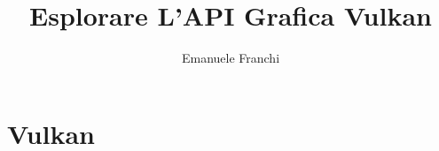 \documentclass{beamer}
\title{Esplorare L'API Grafica Vulkan}
\author{Emanuele Franchi}
\date{}
\begin{document}


\section{Vulkan}




\end{document}
